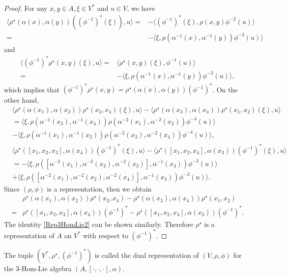 \documentclass[a4paper,11pt]{article}
\def\a{\alpha}
\theoremstyle{definition}
\begin{document}
\begin{proof}
For any $x,y \in A, \xi \in V^*$ and $u \in V$, we have
\begin{align*}
\langle \rho^\star(\a(x),\a(y))((\phi^{-1})^*(\xi)),u \rangle=&
-\langle (\phi^{-1})^*(\xi),\rho(x,y)\phi^{-2}(u) \rangle \\
=&-\langle \xi,\rho(\a^{-1}(x),\a^{-1}(y))\phi^{-3}(u)\rangle
\end{align*}
and
\begin{align*}
\langle (\phi^{-1})^* \rho^\star(x,y)(\xi),u\rangle=&
\langle  \rho^\star(x,y)(\xi),\phi^{-1}(u) \rangle \\
=&-\langle \xi,\rho(\a^{-1}(x),\a^{-1}(y))\phi^{-3}(u)\rangle,
\end{align*}
which implies that $(\phi^{-1})^*\rho^\star(x,y)=\rho^\star(\alpha(x),\a(y))(\phi^{-1})^*$.
On the other hand,
\begin{align*}
&\langle  \rho^\star(\a(x_1),\a(x_2))\rho^\star(x_3,x_4) (\xi),u\rangle
-\langle\rho^\star(\a(x_3),\a(x_4))\rho^\star(x_1,x_2) (\xi),u\rangle \\
&=\langle \xi,\rho(\a^{-1}(x_3),\a^{-1}(x_4))\rho(\a^{-2}(x_1),\a^{-2}(x_2))\phi^{-4}(u)\rangle \\
&-   \langle \xi,\rho(\a^{-1}(x_1),\a^{-1}(x_2))\rho(\a^{-2}(x_3),\a^{-2}(x_4))\phi^{-4}(u)\rangle,
\end{align*}
\begin{align*}
&\langle \rho^\star([x_1,x_2,x_3],\a(x_4))(\phi^{-1})^* (\xi),u \rangle   -
\langle \rho^\star([x_1,x_2,x_4],\a(x_3))(\phi^{-1})^*(\xi),u \rangle \\
&=-\langle \xi,\rho([\a^{-2}(x_1),\a^{-2}(x_2),\a^{-2}(x_3)],\a^{-1}(x_4))\phi^{-3}(u) \rangle \\
&+\langle \xi, \rho([\a^{-2}(x_1),\a^{-2}(x_2),\a^{-2}(x_4)],\a^{-1}(x_3))\phi^{-3}(u) \rangle.
\end{align*}
Since $(\rho,\phi)$ is a representation, then we obtain
\begin{align*}
& \rho^\star(\a(x_1),\a(x_2))\rho^\star(x_3,x_4)- \rho^\star(\a(x_3),\a(x_4))\rho^\star(x_1,x_2) \\
=&\rho^\star([x_1,x_2,x_3],\a(x_4))(\phi^{-1})^* -
\rho^\star([x_1,x_2,x_4],\a(x_3))(\phi^{-1})^*.
\end{align*}
The identity \eqref{Rep3HomLie2} can be shown similarly. Therefore $\rho^\star$  is a representation of $A$ on $V^*$ with respect to $(\phi^{-1})^*$.
\end{proof}

The tuple $(V^*,\rho^\star, (\phi^{-1})^*)$ is called the dual representation of $(V,\rho,\phi)$ for the $3$-Hom-Lie algebra  $(A,[\cdot,\cdot,\cdot],\a)$.
\end{document}
